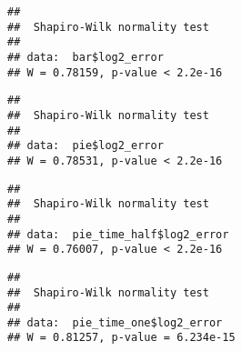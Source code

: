 \documentclass[]{article}
\newenvironment{Shaded}{\begin{snugshade}}{\end{snugshade}}
\newcommand{\KeywordTok}[1]{\textcolor[rgb]{0.13,0.29,0.53}{\textbf{{#1}}}}
\newcommand{\NormalTok}[1]{{#1}}
\begin{document}
\begin{Shaded}
\end{Shaded}

\begin{verbatim}
## 
##  Shapiro-Wilk normality test
## 
## data:  bar$log2_error
## W = 0.78159, p-value < 2.2e-16
\end{verbatim}

\begin{Shaded}
\end{Shaded}

\begin{verbatim}
## 
##  Shapiro-Wilk normality test
## 
## data:  pie$log2_error
## W = 0.78531, p-value < 2.2e-16
\end{verbatim}

\begin{Shaded}
\end{Shaded}

\begin{verbatim}
## 
##  Shapiro-Wilk normality test
## 
## data:  pie_time_half$log2_error
## W = 0.76007, p-value < 2.2e-16
\end{verbatim}

\begin{Shaded}
\end{Shaded}

\begin{verbatim}
## 
##  Shapiro-Wilk normality test
## 
## data:  pie_time_one$log2_error
## W = 0.81257, p-value = 6.234e-15
\end{verbatim}

\begin{Shaded}
\end{Shaded}
\end{document}
